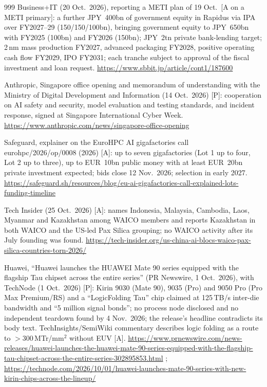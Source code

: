 \begin{thebibliography}{999}
 Business+IT (20 Oct.\ 2026), reporting a METI plan of 19 Oct.\ [A on a METI primary]: a further JPY~400bn of government equity in Rapidus via IPA over FY2027--29 (150/150/100bn), bringing government equity to JPY~650bn with FY2025 (100bn) and FY2026 (150bn); JPY~2tn private bank-lending target; 2\,nm mass production FY2027, advanced packaging FY2028, positive operating cash flow FY2029, IPO FY2031; each tranche subject to approval of the fiscal investment and loan request. \url{https://www.sbbit.jp/article/cont1/187600}

 Anthropic, Singapore office opening and memorandum of understanding with the Ministry of Digital Development and Information (14 Oct.\ 2026) [P]: cooperation on AI safety and security, model evaluation and testing standards, and incident response, signed at Singapore International Cyber Week. \url{https://www.anthropic.com/news/singapore-office-opening}

 Safeguard, explainer on the EuroHPC AI gigafactories call eurohpc/2026/op/0008 (2026) [A]: up to seven gigafactories (Lot 1 up to four, Lot 2 up to three), up to EUR~10bn public money with at least EUR~20bn private investment expected; bids close 12 Nov.\ 2026; selection in early 2027. \url{https://safeguard.sh/resources/blog/eu-ai-gigafactories-call-explained-lots-funding-timeline}

 Tech Insider (25 Oct.\ 2026) [A]: names Indonesia, Malaysia, Cambodia, Laos, Myanmar and Kazakhstan among WAICO members and reports Kazakhstan in both WAICO and the US-led Pax Silica grouping; no WAICO activity after its July founding was found. \url{https://tech-insider.org/us-china-ai-blocs-waico-pax-silica-countries-torn-2026/}

 Huawei, ``Huawei launches the HUAWEI Mate 90 series equipped with the flagship Tau chipset across the entire series'' (PR Newswire, 1 Oct.\ 2026), with TechNode (1 Oct.\ 2026) [P]: Kirin 9030 (Mate 90), 9035 (Pro) and 9050 Pro (Pro Max Premium/RS) and a ``LogicFolding Tau'' chip claimed at 125\,TB/s inter-die bandwidth and ``5 million signal bonds''; no process node disclosed and no independent teardown found by 4 Nov.\ 2026; the release's headline contradicts its body text. TechInsights/SemiWiki commentary describes logic folding as a route to $>$300\,MTr/mm$^2$ without EUV [A]. \url{https://www.prnewswire.com/news-releases/huawei-launches-the-huawei-mate-90-series-equipped-with-the-flagship-tau-chipset-across-the-entire-series-302895853.html} ; \url{https://technode.com/2026/10/01/huawei-launches-mate-90-series-with-new-kirin-chips-across-the-lineup/}


\end{thebibliography}
